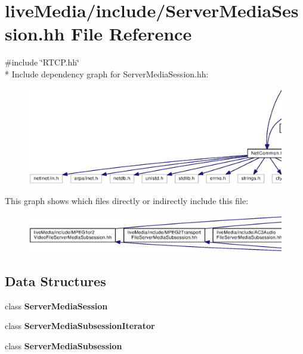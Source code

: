 \section{live\+Media/include/\+Server\+Media\+Session.hh File Reference}
\label{ServerMediaSession_8hh}
{\ttfamily \#include \char`\"{}R\+T\+C\+P.\+hh\char`\"{}}\\*
Include dependency graph for Server\+Media\+Session.\+hh\+:
\nopagebreak
\begin{figure}[H]
\begin{center}
\leavevmode
\includegraphics[width=350pt]{ServerMediaSession_8hh__incl}
\end{center}
\end{figure}
This graph shows which files directly or indirectly include this file\+:
\nopagebreak
\begin{figure}[H]
\begin{center}
\leavevmode
\includegraphics[width=350pt]{ServerMediaSession_8hh__dep__incl}
\end{center}
\end{figure}
\subsection*{Data Structures}
\begin{DoxyCompactItemize}
\item 
class {\bf Server\+Media\+Session}
\item 
class {\bf Server\+Media\+Subsession\+Iterator}
\item 
class {\bf Server\+Media\+Subsession}
\end{DoxyCompactItemize}
